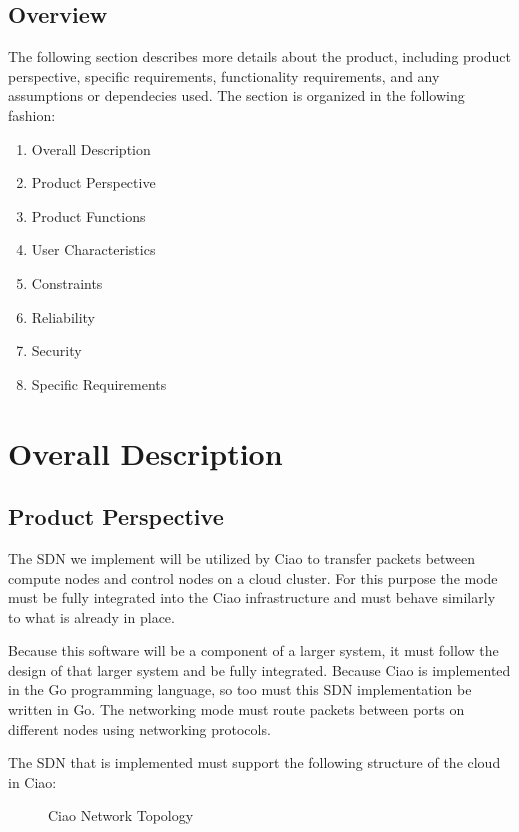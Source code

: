 \documentclass[10pt,letterpaper,onecolumn,draftclsnofoot]{IEEEtran}
\begin{document}



\subsection{Overview}
The following section describes more details about the product, including 
product perspective, specific requirements, functionality requirements, and any
assumptions or dependecies used. The section is organized in the following
fashion:
\begin{enumerate}
	\item Overall Description
	\item Product Perspective
	\item Product Functions
	\item User Characteristics
	\item Constraints
	\item Reliability
	\item Security
	\item Specific Requirements
\end{enumerate}

\section{Overall Description}

\subsection{Product Perspective}

The SDN we implement will be utilized by Ciao to transfer packets between
compute nodes and control nodes on a cloud cluster. For this purpose the mode
must be fully integrated into the Ciao infrastructure and must behave similarly
to what is already in place.

Because this software will be a component of a larger system, it must follow the
design of that larger system and be fully integrated. Because Ciao is
implemented in the Go programming language, so too must this SDN implementation
be written in Go. The networking mode must route packets between ports on
different nodes using networking protocols.

The SDN that is implemented must support the following structure of the cloud in
Ciao:

\begin{figure}[H]
	\caption{Ciao Network Topology~\cite{ciaoNetTopology}}
	\begin{center}
	\end{center}
\end{figure}
\end{document}
